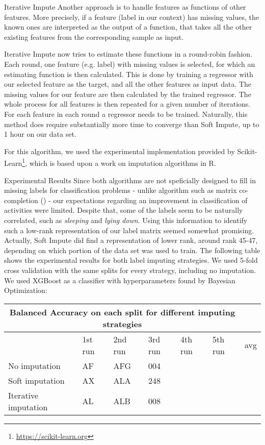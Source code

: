 \begin{subsection}{Iterative Impute}
	Another approach is to handle features as functions of other features. More precisely, if a feature (label in our context) has missing values, the known ones are interpreted as the output of a function, that takes all the other existing features from the corresponding sample as input. \par
	Iterative Impute now tries to estimate these functions in a round-robin fashion. Each round, one feature (e.g. label) with missing values is selected, for which an estimating function is then calculated. This is done by training a regressor with our selected feature as the target, and all the other features as input data. The missing values for our feature are then calculated by the trained regressor. The whole process for all features is then repeated for a given number of iterations. For each feature in each round a regressor needs to be trained. Naturally, this method does require substantially more time to converge than Soft Impute, up to 1 hour on our data set. \par
	
	For this algorithm, we used the experimental implementation provided by Scikit-Learn\footnote{\href{https://scikit-learn.org/stable/}{https://scikit-learn.org}}, which is based upon a work on imputation algorithms in R. \cite{buuren2010mice}
\end{subsection}

\begin{subsection}{Experimental Results}
	Since both algorithms are not speficially designed to fill in missing labels for classification problems - unlike algorithm such as matrix co-completion (\cite{Xu18}) - our expectations regarding an improvement in classification of activities were limited. Despite that, some of the labels seem to be naturally correlated, such as \emph{sleeping} and \emph{lying down}. Using this information to identify such a low-rank representation of our label matrix seemed somewhat promising. Actually, Soft Impute did find a representation of lower rank, around rank 45-47, depending on which portion of the data set was used to train. The following table shows the experimental results for both label imputing strategies. We used 5-fold cross validation with the same splits for every strategy, including no imputation. We used XGBoost as a classifier with hyperparameters found by Bayesian Optimization:
	
	\begin{center}
		\begin{tabular}{ |p{3cm}||p{3cm}|p{3cm}|p{3cm}|p{3cm}|p{3cm}|p{3cm}|  }
			\hline
			\multicolumn{6}{|c|}{Balanced Accuracy on each split for different imputing strategies} \\
			\hline
			& 1st run &2nd run &3rd run& 4th run & 5th run & avg\\
			\hline
			No imputation   & AF    &AFG&   004&&&\\
			Soft imputation&   AX  & ALA   &248&&&\\
			Iterative imputation&AL & ALB&  008&&&\\
			\hline
		\end{tabular}
	\end{center}
\end{subsection}